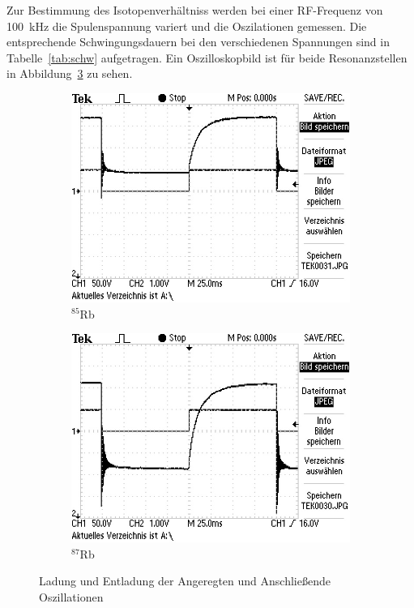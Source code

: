 Zur Bestimmung des Isotopenverhältniss werden bei einer RF-Frequenz von
\SI{100}{\kilo\hertz} die Spulenspannung variert und die Oszilationen gemessen.
Die entsprechende Schwingungsdauern bei den verschiedenen Spannungen sind in
Tabelle~\ref{tab:schw} aufgetragen.
Ein Oszilloskopbild ist für beide Resonanzstellen in 
Abbildung~\ref{fig:osz} zu sehen.
\begin{figure}[h]
	\centering
	\begin{subfigure}[c]{0.45\textwidth}
	\begin{center}
	\includegraphics[width=\textwidth]{./picture/Peak_1.JPG}
	\end{center}
	\caption{$^{85}$Rb}
	\label{fig:}
	\end{subfigure}
	\begin{subfigure}[c]{0.45\textwidth}
	\begin{center}
	\includegraphics[width=\textwidth]{./picture/Peak_2.JPG}
	\end{center}
	\caption{$^{87}$Rb}
	\label{fig:}
	\end{subfigure}
	\caption{Ladung und Entladung der Angeregten und Anschließende Oszillationen}
	\label{fig:osz}
\end{figure}
